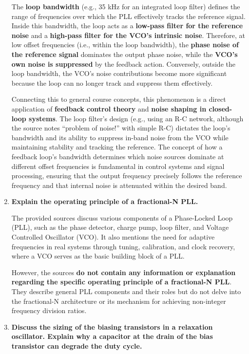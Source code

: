 \documentclass[
  a4paper,
]{article}
\begin{document}
\begin{enumerate}
  The \textbf{loop bandwidth} (e.g., 35 kHz for an integrated loop
  filter) defines the range of frequencies over which the PLL
  effectively tracks the reference signal. Inside this bandwidth, the
  loop acts as a \textbf{low-pass filter for the reference noise} and a
  \textbf{high-pass filter for the VCO's intrinsic noise}. Therefore, at
  low offset frequencies (i.e., within the loop bandwidth), the
  \textbf{phase noise of the reference signal} dominates the output
  phase noise, while the \textbf{VCO's own noise is suppressed} by the
  feedback action. Conversely, outside the loop bandwidth, the VCO's
  noise contributions become more significant because the loop can no
  longer track and suppress them effectively.

  Connecting this to general course concepts, this phenomenon is a
  direct application of \textbf{feedback control theory} and
  \textbf{noise shaping in closed-loop systems}. The loop filter's
  design (e.g., using an R-C network, although the source notes
  ``problem of noise!'' with simple R-C) dictates the loop's bandwidth
  and its ability to suppress in-band noise from the VCO while
  maintaining stability and tracking the reference. The concept of how a
  feedback loop's bandwidth determines which noise sources dominate at
  different offset frequencies is fundamental in control systems and
  signal processing, ensuring that the output frequency precisely
  follows the reference frequency and that internal noise is attenuated
  within the desired band.
\item
  \textbf{Explain the operating principle of a fractional-N PLL.}

  The provided sources discuss various components of a Phase-Locked Loop
  (PLL), such as the phase detector, charge pump, loop filter, and
  Voltage Controlled Oscillator (VCO). It also mentions the need for
  adaptive frequencies in real systems through tuning, calibration, and
  clock recovery, where a VCO serves as the basic building block of a
  PLL.

  However, the sources \textbf{do not contain any information or
  explanation regarding the specific operating principle of a
  fractional-N PLL}. They describe general PLL components and their
  roles but do not delve into the fractional-N architecture or its
  mechanism for achieving non-integer frequency division ratios.
\item
  \textbf{Discuss the sizing of the biasing transistors in a relaxation
  oscillator. Explain why a capacitor at the drain of the bias
  transistor can degrade the duty cycle.}


\end{enumerate}
\end{document}
